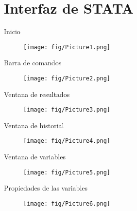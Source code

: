 \section{Interfaz de STATA}

\begin{frame}{Inicio}
				\begin{figure}
		\centering
		\texttt{[image: fig/Picture1.png]}
	\end{figure}
\end{frame}

\begin{frame}{Barra de comandos}
				\begin{figure}
		\centering
		\texttt{[image: fig/Picture2.png]}
	\end{figure}
\end{frame}

\begin{frame}{Ventana de resultados}
	\begin{figure}
		\centering
		\texttt{[image: fig/Picture3.png]}
	\end{figure}
\end{frame}

\begin{frame}{Ventana de historial}
	\begin{figure}
		\centering
		\texttt{[image: fig/Picture4.png]}
	\end{figure}
\end{frame}

\begin{frame}{Ventana de variables}
	\begin{figure}
		\centering
		\texttt{[image: fig/Picture5.png]}
	\end{figure}
\end{frame}

\begin{frame}{Propiedades de las variables}
	\begin{figure}
		\centering
		\texttt{[image: fig/Picture6.png]}
	\end{figure}
\end{frame}